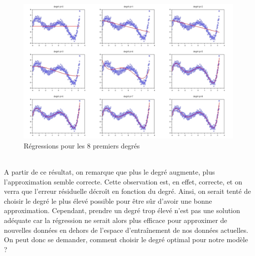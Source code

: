          \begin{figure}[h]
              \centering
                \includegraphics[width=1\textwidth]{images/reg.jpg}
              \caption{Régressions pour les 8 premiers degrés}
              \label{fig:reg3}
            \end{figure}
        \\
        A partir de ce résultat, on remarque que plus le degré augmente, plus l'approximation semble correcte. Cette observation est, en effet, correcte, et on verra que l'erreur résiduelle décroît en fonction du degré. Ainsi, on serait tenté de choisir le degré le plus élevé possible pour être sûr d'avoir une bonne approximation. Cependant, prendre un degré trop élevé n'est pas une solution adéquate car la régression ne serait alors plus efficace pour approximer de nouvelles données en dehors de l'espace d'entraînement de nos données actuelles. On peut donc se demander, comment choisir le degré optimal pour notre modèle ?
        \newpage

